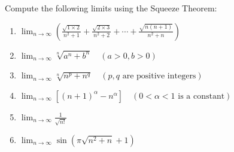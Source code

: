 \begin{exercise}
Compute the following limits using the Squeeze Theorem:
\begin{enumerate}
    \item $\lim_{n \to \infty}\left(\frac{\sqrt{1 \times 2}}{n^{2}+1}+\frac{\sqrt{2 \times 3}}{n^{2}+2}+\cdots+\frac{\sqrt{n(n+1)}}{n^{2}+n}\right)$
    \item $\lim_{n \to \infty} \sqrt[n]{a^{n}+b^{n}} \quad(a>0, b>0)$
    \item $\lim_{n \to \infty} \sqrt[n]{n^{p}+n^{q}} \quad(p, q \text{ are positive integers})$
    \item $\lim_{n \to \infty}\left[(n+1)^{\alpha}-n^{\alpha}\right] \quad(0<\alpha<1 \text{ is a constant})$
    \item $\lim_{n \to \infty} \frac{1}{\sqrt{n!}}$
    \item $\lim_{n \to \infty} \sin(\pi \sqrt{n^2 + n} + 1)$
\end{enumerate}
\end{exercise}
